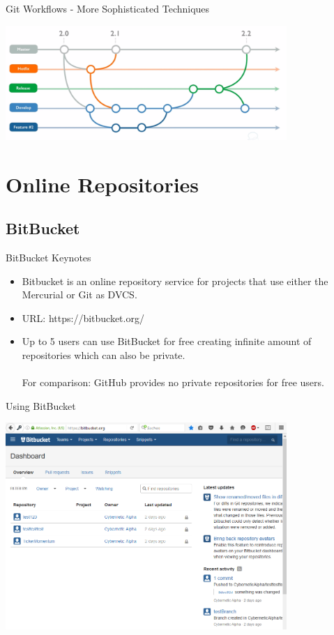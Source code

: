 \documentclass[xcolor=dvipsnames]{beamer}
\begin{document}
\begin{frame}{Git Workflows - More Sophisticated Techniques}

\includegraphics[width = 0.8\textwidth]{sophisticatedTechniques.png}

\end{frame}

\section{Online Repositories}

\subsection{BitBucket}

\begin{frame}{BitBucket Keynotes}

\begin{itemize}

	\item Bitbucket is an online repository service for projects that use either the Mercurial or Git as DVCS.
	\item URL: https://bitbucket.org/
	\item Up to 5 users can use BitBucket for free creating infinite amount of repositories which can also be private.
\\~\\For comparison: GitHub provides no private repositories for free users.

\end{itemize}

\end{frame}

\begin{frame}{Using BitBucket}

\includegraphics[width = 0.8\textwidth]{bitBucket.png}

\end{frame}
\end{document}
